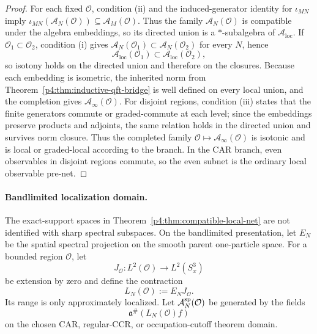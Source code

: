 \documentclass[12pt,a4paper]{article}
\begin{document}
\begin{proof}
For each fixed \(\mathcal O\), condition (ii) and the induced-generator
identity for \(\iota_{MN}\) imply
\(\iota_{MN}(\mathcal A_N(\mathcal O))
\subseteq\mathcal A_M(\mathcal O)\).
Thus the family \(\mathcal A_N(\mathcal O)\) is compatible under the algebra
embeddings, so its directed union is a \(*\)-subalgebra of
\(\mathcal A_{\mathrm{loc}}\).
If \(\mathcal O_1\subset \mathcal O_2\), condition (i) gives \(\mathcal A_N(\mathcal O_1)\subset \mathcal A_N(\mathcal O_2)\) for every \(N\), hence
\[
\mathcal A_{\mathrm{loc}}(\mathcal O_1)\subset \mathcal A_{\mathrm{loc}}(\mathcal O_2),
\]
so isotony holds on the directed union and therefore on the closures.
Because each embedding is isometric, the inherited norm from Theorem~\ref{p4:thm:inductive-qft-bridge} is well defined on every local union, and the completion gives \(\mathcal A_\infty(\mathcal O)\).
For disjoint regions, condition (iii) states that the finite generators commute or graded-commute at each level; since the embeddings preserve products and adjoints, the same relation holds in the directed union and survives norm closure.
Thus the completed family
\(\mathcal O\mapsto \mathcal A_\infty(\mathcal O)\) is isotonic and is local
or graded-local according to the branch.  In the CAR branch, even
observables in disjoint regions commute, so the even subnet is the ordinary
local observable pre-net. \qedhere
\end{proof}


\paragraph{Bandlimited localization domain.}
The exact-support spaces in
Theorem~\ref{p4:thm:compatible-local-net} are not identified with sharp
spectral subspaces.  On the bandlimited presentation, let \(E_N\) be the
spatial spectral projection on the smooth parent one-particle space.  For a
bounded region \(\mathcal O\), let
\[
J_{\mathcal O}:L^2(\mathcal O)\longrightarrow L^2(S^3_x)
\]
be extension by zero and define the contraction
\[
L_N(\mathcal O):=E_NJ_{\mathcal O}.
\]
Its range is only approximately localized.  Let
\(\mathcal A_N^{\rm sp}(\mathcal O)\) be generated by the fields
\[
\mathfrak a^\#(L_N(\mathcal O)f)
\]
on the chosen CAR, regular-CCR, or occupation-cutoff theorem domain.
\end{document}
